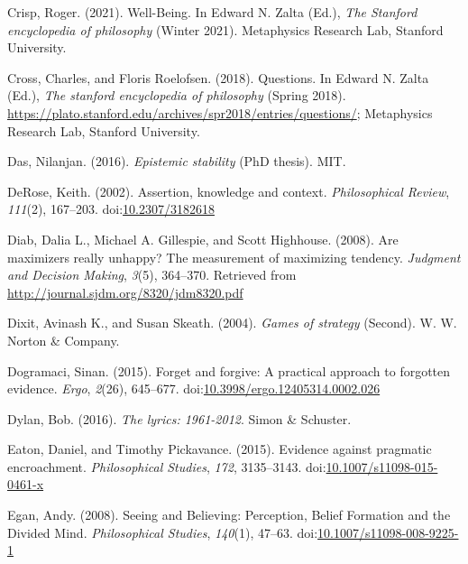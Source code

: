 \documentclass[
  12pt,
  letterpaper,
]{scrbook}
\newlength{\cslhangindent}
\newenvironment{CSLReferences}[2] %
 {\begin{list}{}{%
  \setlength{\itemindent}{0pt}
  \setlength{\leftmargin}{0pt}
  \setlength{\parsep}{0pt}
  \ifodd #1
   \setlength{\leftmargin}{\cslhangindent}
   \setlength{\itemindent}{-1\cslhangindent}
  \fi
  \setlength{\itemsep}{#2\baselineskip}}}
 {\end{list}}
\begin{document}
\begin{CSLReferences}{1}{0}
Crisp, Roger. (2021). {Well-Being}. In Edward N. Zalta (Ed.), \emph{The
{Stanford} encyclopedia of philosophy} ({W}inter 2021). Metaphysics
Research Lab, Stanford University.

Cross, Charles, and Floris Roelofsen. (2018). Questions. In Edward N.
Zalta (Ed.), \emph{The stanford encyclopedia of philosophy} (Spring
2018).
\url{https://plato.stanford.edu/archives/spr2018/entries/questions/};
Metaphysics Research Lab, Stanford University.

Das, Nilanjan. (2016). \emph{Epistemic stability} (PhD thesis). {MIT}.

DeRose, Keith. (2002). Assertion, knowledge and context.
\emph{Philosophical Review}, \emph{111}(2), 167--203.
doi:\href{https://doi.org/10.2307/3182618}{10.2307/3182618}

Diab, Dalia L., Michael A. Gillespie, and Scott Highhouse. (2008). Are
maximizers really unhappy? The measurement of maximizing tendency.
\emph{Judgment and Decision Making}, \emph{3}(5), 364--370. Retrieved
from \url{http://journal.sjdm.org/8320/jdm8320.pdf}

Dixit, Avinash K., and Susan Skeath. (2004). \emph{Games of strategy}
(Second). W. W. Norton \& Company.

Dogramaci, Sinan. (2015). Forget and forgive: A practical approach to
forgotten evidence. \emph{Ergo}, \emph{2}(26), 645--677.
doi:\href{https://doi.org/10.3998/ergo.12405314.0002.026}{10.3998/ergo.12405314.0002.026}

Dylan, Bob. (2016). \emph{The lyrics: 1961-2012}. Simon \& Schuster.

Eaton, Daniel, and Timothy Pickavance. (2015). Evidence against
pragmatic encroachment. \emph{Philosophical Studies}, \emph{172},
3135--3143.
doi:\href{https://doi.org/10.1007/s11098-015-0461-x}{10.1007/s11098-015-0461-x}

Egan, Andy. (2008). {Seeing and Believing: Perception, Belief Formation
and the Divided Mind}. \emph{Philosophical Studies}, \emph{140}(1),
47--63.
doi:\href{https://doi.org/10.1007/s11098-008-9225-1}{10.1007/s11098-008-9225-1}


\end{CSLReferences}
\end{document}
